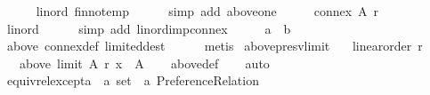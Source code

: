 \begin{isabellebody}
\ \ \ \ \isamarkupfalse%
\ lin{\isacharunderscore}{\kern0pt}ord\ fin{\isacharunderscore}{\kern0pt}not{\isacharunderscore}{\kern0pt}emp\isanewline
\ \ \ \ \isamarkupfalse%
\ {\isacharparenleft}{\kern0pt}simp\ add{\isacharcolon}{\kern0pt}\ above{\isacharunderscore}{\kern0pt}one{\isacharparenright}{\kern0pt}\isanewline
\ \ \isamarkupfalse%
\ \isamarkupfalse%
\ {\isachardoublequoteopen}connex\ A\ r{\isachardoublequoteclose}\isanewline
\ \ \ \ \isamarkupfalse%
\ lin{\isacharunderscore}{\kern0pt}ord\isanewline
\ \ \ \ \isamarkupfalse%
\ {\isacharparenleft}{\kern0pt}simp\ add{\isacharcolon}{\kern0pt}\ lin{\isacharunderscore}{\kern0pt}ord{\isacharunderscore}{\kern0pt}imp{\isacharunderscore}{\kern0pt}connex{\isacharparenright}{\kern0pt}\isanewline
\ \ \isamarkupfalse%
\ \isamarkupfalse%
\ {\isachardoublequoteopen}a\ {\isacharequal}{\kern0pt}\ b{\isachardoublequoteclose}\isanewline
\ \ \ \ \isamarkupfalse%
\ above{}\ connex{\isacharunderscore}{\kern0pt}def\ limited{\isacharunderscore}{\kern0pt}dest\isanewline
\ \ \ \ \isamarkupfalse%
\ metis\isanewline
{}\isamarkupfalse%
%
\endisatagproof
{\isafoldproof}%
%
\isadelimproof
\isanewline
%
\endisadelimproof
\isanewline
{}\isamarkupfalse%
\ above{\isacharunderscore}{\kern0pt}presv{\isacharunderscore}{\kern0pt}limit{\isacharcolon}{\kern0pt}\isanewline
\ \ \ {\isachardoublequoteopen}linear{\isacharunderscore}{\kern0pt}order\ r{\isachardoublequoteclose}\isanewline
\ \ \ {\isachardoublequoteopen}above\ {\isacharparenleft}{\kern0pt}limit\ A\ r{\isacharparenright}{\kern0pt}\ x\ {\isasymsubseteq}\ A{\isachardoublequoteclose}\isanewline
%
\isadelimproof
\ \ %
\endisadelimproof
%
\isatagproof
{}\isamarkupfalse%
\ above{\isacharunderscore}{\kern0pt}def\isanewline
\ \ \isamarkupfalse%
\ auto%
\endisatagproof
{\isafoldproof}%
%
\isadelimproof
%
\endisadelimproof
%
\isadelimdocument
%
\endisadelimdocument
%
\isatagdocument
%
\isamarkuptrue%
%
\endisatagdocument
{\isafolddocument}%
%
\isadelimdocument
%
\endisadelimdocument
{}\isamarkupfalse%
\ equiv{\isacharunderscore}{\kern0pt}rel{\isacharunderscore}{\kern0pt}except{\isacharunderscore}{\kern0pt}a\ {\isacharcolon}{\kern0pt}{\isacharcolon}{\kern0pt}\ {\isachardoublequoteopen}{\isacharprime}{\kern0pt}a\ set\ {\isasymRightarrow}\ {\isacharprime}{\kern0pt}a\ Preference{\isacharunderscore}{\kern0pt}Relation\ {\isasymRightarrow}\isanewline

\end{isabellebody}
